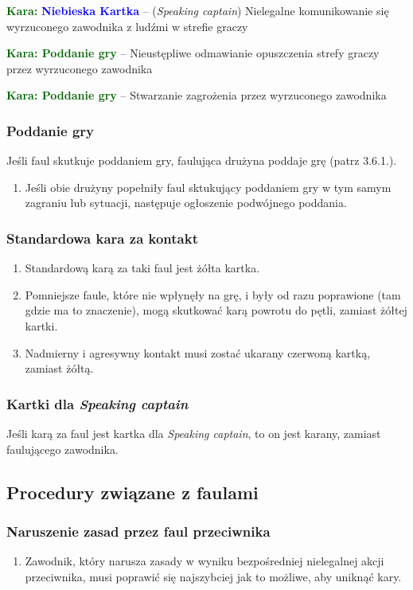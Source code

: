 \documentclass[11pt,a4paper]{article}
\newcommand\bluecard[1]{\bgroup\textcolor{darkgreen}{\textbf{Kara: }}\bgroup\textcolor{blue}{\textbf{Niebieska Kartka}} -- #1}
\newcommand\penaltyd[2]{\bgroup\textcolor{darkgreen}{\textbf{Kara: #1}} -- #2}
\begin{document}
\bluecard{(\emph{Speaking captain}) Nielegalne komunikowanie się wyrzuconego zawodnika z ludźmi w strefie graczy}

\penaltyd{Poddanie gry}{Nieustępliwe odmawianie opuszczenia strefy graczy przez wyrzuconego zawodnika}

\penaltyd{Poddanie gry}{Stwarzanie zagrożenia przez wyrzuconego zawodnika}

\subsubsection{Poddanie gry}
Jeśli faul skutkuje poddaniem gry, faulująca drużyna poddaje grę (patrz 3.6.1.). %
\begin{enumerate}
  \item Jeśli obie drużyny popełniły faul sktukujący poddaniem gry w tym samym zagraniu lub sytuacji, następuje ogłoszenie podwójnego poddania.
\end{enumerate}

\subsubsection{Standardowa kara za kontakt}
\begin{enumerate}
  \item Standardową karą za taki faul jest żółta kartka.
  \item Pomniejsze faule, które nie wpłynęły na grę, i były od razu poprawione (tam gdzie ma to znaczenie), mogą skutkować karą powrotu do pętli, zamiast żółtej kartki.
  \item Nadmierny i agresywny kontakt musi zostać ukarany czerwoną kartką, zamiast żółtą.
\end{enumerate}

\subsubsection{Kartki dla \emph{Speaking captain}}
Jeśli karą za faul jest kartka dla \emph{Speaking captain}, to on jest karany, zamiast faulującego zawodnika.

\subsection{Procedury związane z faulami}

\subsubsection{Naruszenie zasad przez faul przeciwnika}
\begin{enumerate}
  \item Zawodnik, który narusza zasady w wyniku bezpośredniej nielegalnej akcji przeciwnika, musi poprawić się najszybciej jak to możliwe, aby uniknąć kary.
\end{enumerate}
\end{document}
